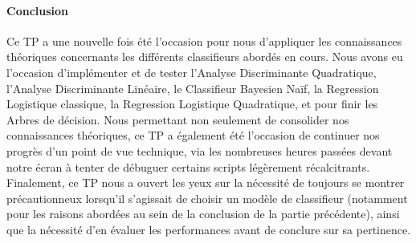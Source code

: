 \documentclass{report}
\begin{document}
\paragraph{Conclusion}
Ce TP a une nouvelle fois été l'occasion pour nous d'appliquer les connaissances théoriques concernants les différents classifieurs abordés en cours. Nous avons eu l'occasion d'implémenter et de tester l'Analyse Discriminante Quadratique, l'Analyse Discriminante Linéaire, le Classifieur Bayesien Naïf, la Regression Logistique classique, la Regression Logistique Quadratique, et pour finir les Arbres de décision. Nous permettant non seulement de consolider nos connaissances théoriques, ce TP a également été l'occasion de continuer nos progrès d'un point de vue technique, via les nombreuses heures passées devant notre écran à tenter de débuguer certains scripts légèrement récalcitrants. Finalement, ce TP nous a ouvert les yeux sur la nécessité de toujours se montrer précautionneux lorsqu'il s'agissait de choisir un modèle de classifieur (notamment pour les raisons abordées au sein de la conclusion de la partie précédente), ainsi que la nécessité d'en évaluer les performances avant de conclure sur sa pertinence.
\end{document}
